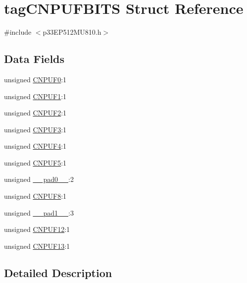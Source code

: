 \hypertarget{structtag_c_n_p_u_f_b_i_t_s}{}\section{tag\+C\+N\+P\+U\+F\+B\+I\+TS Struct Reference}
\label{structtag_c_n_p_u_f_b_i_t_s}


{\ttfamily \#include $<$p33\+E\+P512\+M\+U810.\+h$>$}

\subsection*{Data Fields}
\begin{DoxyCompactItemize}
\item 
unsigned \hyperlink{structtag_c_n_p_u_f_b_i_t_s_ab190db8bf6bdff983867ea02e97f2775}{C\+N\+P\+U\+F0}\+:1
\item 
unsigned \hyperlink{structtag_c_n_p_u_f_b_i_t_s_af26771bbef528aed2ed0e97bfbf0c565}{C\+N\+P\+U\+F1}\+:1
\item 
unsigned \hyperlink{structtag_c_n_p_u_f_b_i_t_s_aee70c12748d57772bbe6b7608cf15460}{C\+N\+P\+U\+F2}\+:1
\item 
unsigned \hyperlink{structtag_c_n_p_u_f_b_i_t_s_ae6443da6db3d47ca65b280dd20d9ffbe}{C\+N\+P\+U\+F3}\+:1
\item 
unsigned \hyperlink{structtag_c_n_p_u_f_b_i_t_s_a4bd36f3e7b964e9238570b8daa6d5869}{C\+N\+P\+U\+F4}\+:1
\item 
unsigned \hyperlink{structtag_c_n_p_u_f_b_i_t_s_a5136f1a44d6099f60290fde0aee2ab11}{C\+N\+P\+U\+F5}\+:1
\item 
unsigned \hyperlink{structtag_c_n_p_u_f_b_i_t_s_adf71f3d8410c1f1dbbc96680a92c49af}{\+\_\+\+\_\+pad0\+\_\+\+\_\+}\+:2
\item 
unsigned \hyperlink{structtag_c_n_p_u_f_b_i_t_s_a4debecf6737596811c06632883f11d3f}{C\+N\+P\+U\+F8}\+:1
\item 
unsigned \hyperlink{structtag_c_n_p_u_f_b_i_t_s_acaf2d0924a107ec6e8d2e31febaf66f9}{\+\_\+\+\_\+pad1\+\_\+\+\_\+}\+:3
\item 
unsigned \hyperlink{structtag_c_n_p_u_f_b_i_t_s_a2a11a4dd1668e139c253459c1aaeab5d}{C\+N\+P\+U\+F12}\+:1
\item 
unsigned \hyperlink{structtag_c_n_p_u_f_b_i_t_s_a5ede1e0a31b02ecb718effca54421eef}{C\+N\+P\+U\+F13}\+:1
\end{DoxyCompactItemize}


\subsection{Detailed Description}


